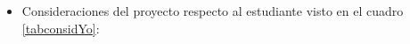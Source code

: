 \begin{itemize}





	
	
	
	
	\item Consideraciones del proyecto respecto al estudiante visto en el cuadro \ref{tabconsidYo}:
	

\end{itemize}
